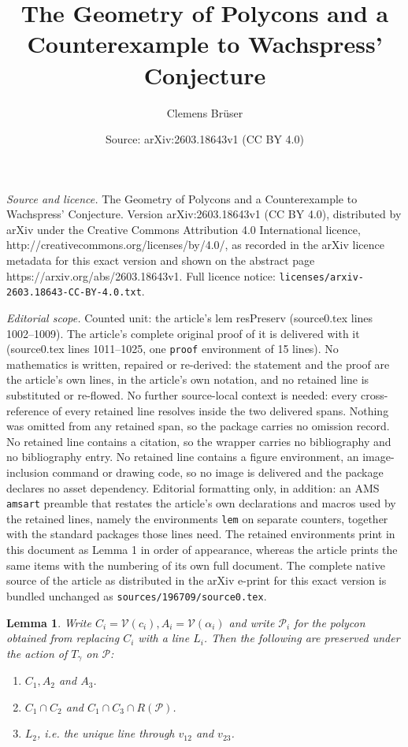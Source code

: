 \documentclass[10pt,a4paper]{amsart}
\title{The Geometry of Polycons and a Counterexample to Wachspress' Conjecture}
\author{Clemens Br\"user}
\date{Source: arXiv:2603.18643v1 (CC BY 4.0)}
\newtheorem{lem}{Lemma}
\newcommand{\cP}{{\mathcal P}}
\newcommand{\cV}{{\mathcal V}}
\begin{document}
\maketitle

\noindent\emph{Source and licence.} The Geometry of Polycons and a Counterexample to Wachspress' Conjecture. Version arXiv:2603.18643v1 (CC BY 4.0), distributed by arXiv under the Creative Commons Attribution 4.0 International licence, http://creativecommons.org/licenses/by/4.0/, as recorded in the arXiv licence metadata for this exact version and shown on the abstract page https://arxiv.org/abs/2603.18643v1. Full licence notice: \texttt{licenses/arxiv-2603.18643-CC-BY-4.0.txt}.\par\smallskip

\noindent\textit{Editorial scope.} Counted unit: the article's lem resPreserv (source0.tex lines 1002--1009). The article's complete original proof of it is delivered with it (source0.tex lines 1011--1025, one \texttt{proof} environment of 15 lines). No mathematics is written, repaired or re-derived: the statement and the proof are the article's own lines, in the article's own notation, and no retained line is substituted or re-flowed.  No further source-local context is needed: every cross-reference of every retained line resolves inside the two delivered spans.  Nothing was omitted from any retained span, so the package carries no omission record.  No retained line contains a citation, so the wrapper carries no bibliography and no bibliography entry.  No retained line contains a figure environment, an image-inclusion command or drawing code, so no image is delivered and the package declares no asset dependency.  Editorial formatting only, in addition: an AMS \texttt{amsart} preamble that restates the article's own declarations and macros used by the retained lines, namely the environments \texttt{lem} on separate counters, together with the standard packages those lines need.  The retained environments print in this document as Lemma 1 in order of appearance, whereas the article prints the same items with the numbering of its own full document.  The complete native source of the article as distributed in the arXiv e-print for this exact version is bundled unchanged as \texttt{sources/196709/source0.tex}.
\begin{lem} \label{lem: resPreserv}
 Write $C_i = \cV(c_i), A_i = \cV(\alpha_i)$ and write $\cP_i$ for the polycon obtained from replacing $C_i$ with a line $L_i$. Then the following are preserved under the action of $T_\gamma$ on $\cP$:
 \begin{enumerate}
     \item $C_1, A_2$ and $A_3$.
     \item $C_1 \cap C_2$ and $C_1 \cap C_3 \cap R(\cP)$.
     \item $L_2$, i.e. the unique line through $v_{12}$ and $v_{23}$.
 \end{enumerate}
\end{lem}
\end{document}
